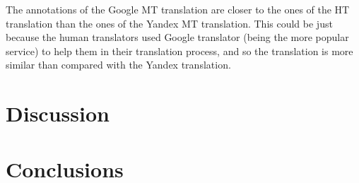 \begin{table}[h]
\centering
{}
\caption{Macro-Evaluation of how close the annotations of MT and MT+PE translation are to the annotations of HT}
\label{table:results_comparasion_translations_macro}
\end{table}

The annotations of the Google MT translation are closer to the ones of the HT translation than the ones of the Yandex MT translation. This could be just because the human translators used Google translator (being the more popular service) to help them in their translation process, and so the translation is more similar than compared with the Yandex translation.  

\section{Discussion}





\section{Conclusions}




  
